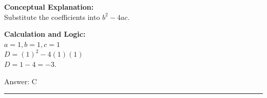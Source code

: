 \documentclass[11pt,paper=a4,answers]{exam}
\begin{document}
\begin{questions}
\begin{solution}
\textbf{Conceptual Explanation:} \\
Substitute the coefficients into $b^2 - 4ac$.

\vspace{20pt}

\textbf{Calculation and Logic:} \\
$a = 1, b = 1, c = 1$ \\
$D = (1)^2 - 4(1)(1)$ \\
$D = 1 - 4 = -3$.

\vspace{25pt}

Answer: \colorbox{yellow!100}{C}
\end{solution}


\end{questions}
\begin{center}
\rule{.5\textwidth}{1pt}
\end{center}
\end{document}

